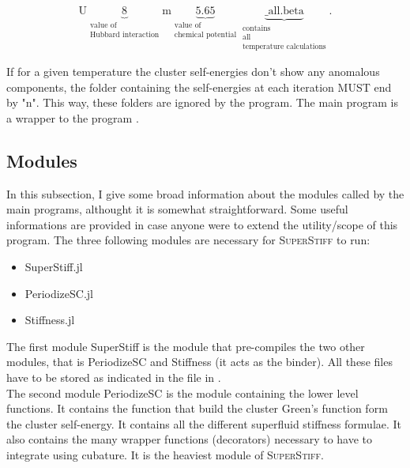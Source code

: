 \documentclass{article}
\begin{document}
\begin{equation}
\label{name_folder_inside_tp}
\text{U}\underbrace{8}_{\substack{\text{value of}\\ \text{Hubbard interaction}}}\text{m}\underbrace{5.65}_{\substack{\text{value of}\\ \text{chemical potential}}}\underbrace{\text{\_all.beta}}_{\substack{\text{contains}\\ \text{all}\\ \text{temperature calculations}}}.
\end{equation}

If for a given temperature the cluster self-energies don't show any anomalous components, the folder containing the self-energies at each iteration MUST end by "n". This way, these folders are ignored by the program. The main program  is a wrapper to the program .

\subsection{Modules}
\label{sec:modules}

In this subsection, I give some broad information about the modules called by the main programs, althought it is somewhat straightforward. Some useful informations are provided in case anyone were to extend the utility/scope of this program. The three following modules are necessary for \textsc{SuperStiff} to run:

\begin{itemize}
\item SuperStiff.jl
\item PeriodizeSC.jl
\item Stiffness.jl
\end{itemize}

The first module SuperStiff is the module that pre-compiles the two other modules, that is PeriodizeSC and Stiffness (it acts as the binder). All these files have to be stored as indicated in the  file in .\\

The second module PeriodizeSC is the module containing the lower level functions. It contains the function that build the cluster Green's function form the cluster self-energy. It contains all the different superfluid stiffness formulae. It also contains the many wrapper functions (decorators) necessary to have to integrate using cubature. It is the heaviest module of \textsc{SuperStiff}.\\
\end{document}

